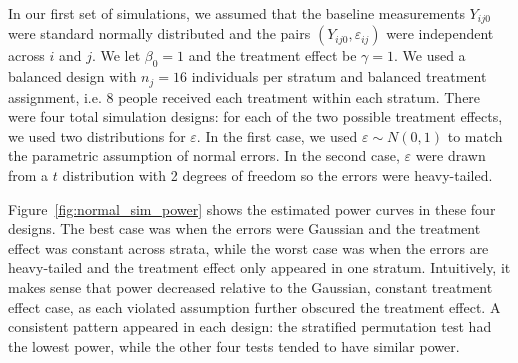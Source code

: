 \documentclass[12pt]{article}
\begin{document}
In our first set of simulations, we assumed that the baseline measurements $Y_{ij0}$ were standard normally distributed and the pairs $(Y_{ij0}, \varepsilon_{ij})$ were independent across $i$ and $j$.
We let $\beta_0 = 1$ and the treatment effect be $\gamma = 1$.
We used a balanced design with $n_j = 16$ individuals per stratum and balanced treatment assignment, i.e. 8 people received each treatment within each stratum.
There were four total simulation designs:
for each of the two possible treatment effects, we used two distributions for $\varepsilon$.
In the first case, we used $\varepsilon \sim N(0, 1)$ to match the parametric assumption of normal errors.
In the second case, $\varepsilon$ were drawn from a $t$ distribution with 2 degrees of freedom so the errors were heavy-tailed.

Figure~\ref{fig:normal_sim_power} shows the estimated power curves in these four designs.
The best case was when the errors were Gaussian and the treatment effect was constant across strata, while the worst case was when the errors are heavy-tailed and the treatment effect only appeared in one stratum.
Intuitively, it makes sense that power decreased relative to the Gaussian, constant treatment effect case, as each violated assumption further obscured the treatment effect.
A consistent pattern appeared in each design: the stratified permutation test had the lowest power, while the other four tests tended to have similar power.
\end{document}
